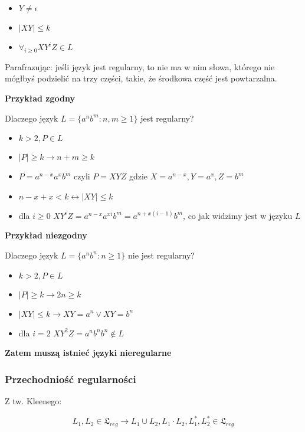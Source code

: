 \documentclass{../notatki}
\begin{document}
\begin{itemize}
    \item $Y \ne \epsilon$
    \item $|XY| \le k$
    \item $\forall_{i \ge 0} XY^iZ \in L$
\end{itemize}

Parafrazując: jeśli język jest regularny, to nie ma w nim słowa, którego nie mógłbyś podzielić na trzy części, takie, że środkowa część jest powtarzalna.

\textbf{Przykład zgodny}

Dlaczego język $L = \{a^nb^m : n,m \ge 1\}$ jest regularny?

\begin{itemize}
    \item $k > 2, P \in L$
    \item $|P| \ge k \rightarrow n + m \ge k$
    \item $P = a^{n - x}a^xb^m$ czyli $P = XYZ$ gdzie $X = a^{n - x}, Y = a^x, Z = b^m$
    \item $n - x + x < k \leftrightarrow |XY| \le k$
    \item dla $i \ge 0$ $XY^iZ = a^{n - x}a^{xi}b^m = a^{n + x(i - 1)}b^m$, co jak widzimy jest w języku $L$
\end{itemize}

\textbf{Przykład niezgodny}

Dlaczego język $L = \{a^nb^n : n \ge 1\}$ nie jest regularny?

\begin{itemize}
    \item $k > 2, P \in L$
    \item $|P| \ge k \rightarrow 2n \ge k$
    \item $|XY| \le k \rightarrow XY = a^n \vee XY = b^n$
    \item dla $i = 2$ $XY^2Z = a^nb^nb^n \notin L$
\end{itemize}

\textbf{Zatem muszą istnieć języki nieregularne}

\subsubsection{Przechodniość regularności}

Z tw. Kleenego:

$$L_1,L_2 \in \mathfrak{L}_{reg} \rightarrow L_1 \cup L_2, L_1 \cdot L_2, L_1^*, L_2^* \in \mathfrak{L}_{reg}$$
\end{document}

